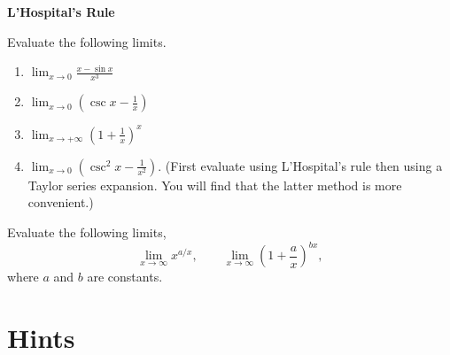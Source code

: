 \begin{large}
  \noindent
  \textbf{L'Hospital's Rule}
\end{large}


\begin{Exercise}
  \label{exercise lim (x - sin x)/x3}
  Evaluate the following limits.
  \renewcommand{\theenumi}{\alph{enumi}}
  \begin{enumerate}
  \item
    $\lim_{x \to 0} \frac{x - \sin x}{x^3}$
  \item
    $\lim_{x \to 0} \left( \csc x - \frac{1}{x} \right)$
  \item
    $\lim_{x \to +\infty} \left( 1 + \frac{1}{x} \right)^x$
  \item
    $\lim_{x \to 0} \left( \csc^2 x - \frac{1}{x^2} \right)$.
    (First evaluate using L'Hospital's rule then using a Taylor series expansion.
    You will find that the latter method is more convenient.)
  \end{enumerate}
  \renewcommand{\theenumi}{\arabic{enumi}}

\end{Exercise}






\begin{Exercise}
  \label{exercise lim x a/x}
  Evaluate the following limits,
  \[
  \lim_{x \to \infty} x^{a/x}, \qquad
  \lim_{x \to \infty} \left( 1 + \frac{a}{x} \right)^{b x},
  \]
  where $a$ and $b$ are constants.

\end{Exercise}

















\raggedbottom
\pagebreak
\flushbottom
\section{Hints}


